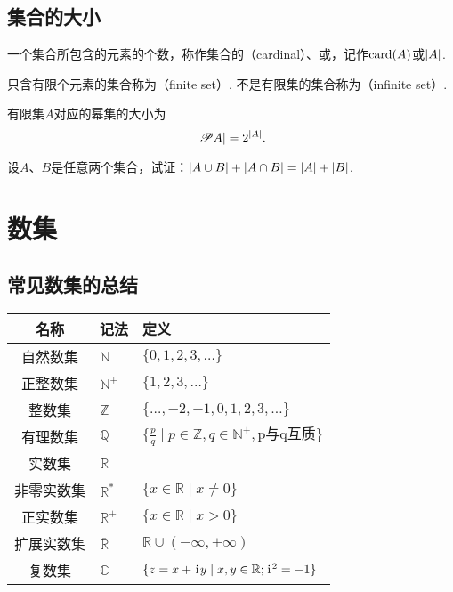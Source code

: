\subsection{集合的大小}
\begin{definition}
一个集合所包含的元素的个数，称作集合的（cardinal）、或，记作\(\operatorname{card}(A)\)或\(\abs{A}\).
\end{definition}

\begin{definition}
只含有限个元素的集合称为（finite set）.
不是有限集的集合称为（infinite set）.
\end{definition}

\begin{property}
有限集\(A\)对应的幂集的大小为\[
\abs{\mathscr{P} A} = 2^{\abs{A}}.
\]
\end{property}

\begin{example}
设\(A\)、\(B\)是任意两个集合，试证：\(\abs{A \cup B} + \abs{A \cap B} = \abs{A} + \abs{B}\).
\end{example}

\section{数集}
\subsection{常见数集的总结}
\begin{center}
\begin{tabular}{c|l|l}
\hline
名称 & 记法 & 定义 \\ \hline
自然数集 & \(\mathbb{N}\) & \(\{ 0,1,2,3,\dotsc \}\) \\
正整数集 & \(\mathbb{N}^+\) & \(\{ 1,2,3,\dotsc \}\) \\
整数集 & \(\mathbb{Z}\) & \(\{ \dotsc,-2,-1,0,1,2,3,\dotsc \}\) \\
有理数集 & \(\mathbb{Q}\) & \(\{ \frac{p}{q} \mid p \in \mathbb{Z}, q \in \mathbb{N}^+, \text{p与q互质} \}\) \\
实数集 & \(\mathbb{R}\) \\
非零实数集 & \(\mathbb{R}^*\) & \(\{ x \in \mathbb{R} \mid x \neq 0 \}\) \\
正实数集 & \(\mathbb{R}^+\) & \(\{ x \in \mathbb{R} \mid x > 0 \}\) \\
扩展实数集 & \(\overline{\mathbb{R}}\) & \(\mathbb{R} \cup (-\infty,+\infty)\) \\
复数集 & \(\mathbb{C}\) & \(\{ z = x + \kern1pt\mathrm{i}\kern1pt y \mid x,y \in \mathbb{R}; \kern1pt\mathrm{i}\kern1pt^2 = -1 \}\) \\ \hline
\end{tabular}
\end{center}

